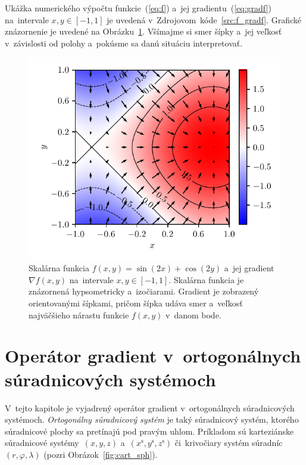 \documentclass[a4paper,12pt]{book}
\begin{document}
Ukážka numerického výpočtu funkcie~(\ref{eq:f}) a~jej 
gradientu~(\ref{eq:gradf}) na~intervale $x, y \in [-1, 1]$ je uvedená 
v~Zdrojovom~kóde~\ref{src:f_gradf}.  Grafické znázornenie je uvedené na 
Obrázku~\ref{fig:f_gradf}.  Všímajme si smer šípky a~jej veľkosť v~závislosti 
od polohy a~pokúsme sa danú situáciu interpretovať.



\begin{figure}[bt]
\centering
\includegraphics{./fig-gradient.pdf}
\caption{Skalárna funkcia $f(x, y) = \sin(2x) + \cos(2y)$ a~jej gradient 
$\nabla f(x, y)$ na~intervale $x, y \in [-1, 1]$.  Skalárna funkcia je 
znázornená hypsometricky a~izočiarami.  Gradient je zobrazený orientovanými 
šípkami, pričom šípka udáva smer a~veľkosť najväčšieho nárastu funkcie $f(x, 
y)$ v~danom bode.}
\label{fig:f_gradf}
\end{figure}






\chapter{Operátor gradient v~ortogonálnych súradnicových systémoch}
\label{app:gradient_in_orthogonal_systems}

V~tejto kapitole je vyjadrený operátor gradient v~ortogonálnych súradnicových 
systémoch.  \emph{Ortogonálny súradnicový systém} je taký súradnicový systém, 
ktorého súradnicové plochy sa pretínajú pod pravým uhlom.  Príkladom sú 
karteziánske súradnicové systémy~$(x, y, z)$ a~$(x^\mathrm{s}, y^\mathrm{s}, 
z^\mathrm{s})$ či~krivočiary systém súradníc~$(r, \varphi, \lambda)$ (pozri 
Obrázok~\ref{fig:cart_sph}).
\end{document}
